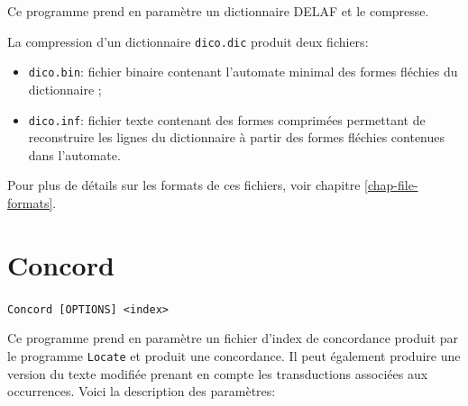 \bigskip
\noindent Ce programme prend en paramètre un dictionnaire DELAF et le compresse.

La compression d’un dictionnaire \verb+dico.dic+ produit deux fichiers:
\begin{itemize}
  \item \verb+dico.bin+: fichier binaire contenant l’automate minimal des formes fléchies du
  	  dictionnaire ;
  \item \verb+dico.inf+: fichier texte contenant des formes comprimées permettant de reconstruire
les lignes du dictionnaire à partir des formes fléchies contenues dans l’automate.
\end{itemize}

\bigskip
\noindent Pour plus de détails sur les formats de ces fichiers, voir chapitre
\ref{chap-file-formats}.






\section{Concord}
\label{section-Concord}
\verb+Concord [OPTIONS] <index>+

\bigskip
\noindent Ce programme prend en paramètre un fichier d’index de concordance produit par le
programme \verb+Locate+ et produit une concordance. Il peut également produire une version
du texte modifiée prenant en compte les transductions associées aux occurrences. Voici la
description des paramètres:


